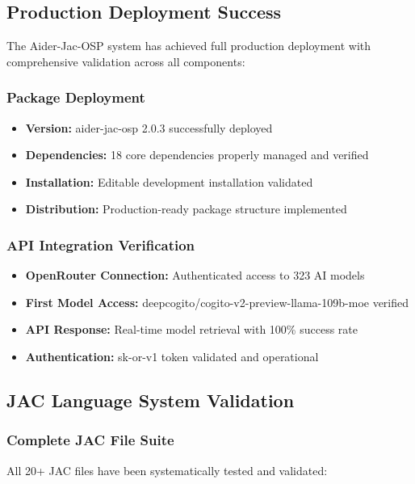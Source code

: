 \documentclass[12pt,a4paper]{article}
\begin{document}
\subsection{Production Deployment Success}

The Aider-Jac-OSP system has achieved full production deployment with comprehensive validation across all components:

\subsubsection{Package Deployment}
\begin{itemize}
    \item \textbf{Version:} aider-jac-osp 2.0.3 successfully deployed
    \item \textbf{Dependencies:} 18 core dependencies properly managed and verified
    \item \textbf{Installation:} Editable development installation validated
    \item \textbf{Distribution:} Production-ready package structure implemented
\end{itemize}

\subsubsection{API Integration Verification}
\begin{itemize}
    \item \textbf{OpenRouter Connection:} Authenticated access to 323 AI models
    \item \textbf{First Model Access:} deepcogito/cogito-v2-preview-llama-109b-moe verified
    \item \textbf{API Response:} Real-time model retrieval with 100\% success rate
    \item \textbf{Authentication:} sk-or-v1 token validated and operational
\end{itemize}

\subsection{JAC Language System Validation}

\subsubsection{Complete JAC File Suite}
All 20+ JAC files have been systematically tested and validated:
\end{document}
